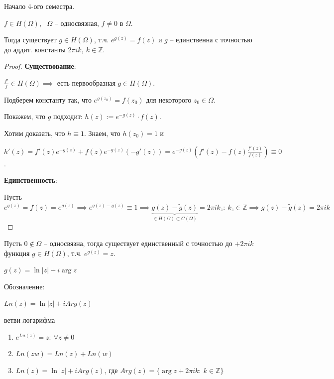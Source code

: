 Начало 4-ого семестра.

\begin{theorem}
    $f \in H(\Omega)$, \ $\Omega$ -- односвязная, $f \not = 0$ в $\Omega$.

    Тогда существует $g \in H(\Omega)$, т.ч. $e^{g(z)} = f(z)$ и $g$ -- единственна с точностью до аддит. константы $2 \pi i k, \ k \in \mathbb{Z}$.
\end{theorem}

\begin{proof}
    \textbf{Существование}:

    $\frac{f'}{f} \in H(\Omega) \implies $ есть первообразная $g \in H(\Omega)$.

    Подберем константу так, что $e^{g(z_0)} =  f(z_0)$ для некоторого $z_0 \in \Omega$.

    Покажем, что $g$ подходит: $h(z) := e^{-g(z)} \cdot f(z)$.

    Хотим доказать, что $h \equiv 1$. Знаем, что $h(z_0) = 1$ и

    $h'(z) = f'(z) e^{-g(z)} + f(z) e^{-g(z)} (-g'(z)) = e^{-g(z)} \left( f'(z) - f(z) \frac{f'(z)}{f(z)} \right) \equiv 0$.

    \textbf{Единственность}:

    Пусть $e^{g(z)} = f(z) = e^{\tilde{g}(z)} \implies e^{g(z) - \tilde{g}(z)} \equiv 1 \implies \underbrace{g(z) - \tilde{g}(z)}_{\in H(\Omega) \subset C(\Omega)} = 2 \pi i k_{z}: \ k_{z} \in \mathbb{Z} \implies g(z) - \tilde{g}(z) = 2 \pi i k$
\end{proof}

\begin{consequence}
    Пусть $0 \not \in \Omega$ -- односвязна, тогда существует единственный с точностью до $+ 2 \pi i k$ функция $g \in H(\Omega)$, т.ч. $e^{g(z)} = z$.
\end{consequence}

\begin{remark}
    $g(z) = \ln{|z|} + i \arg{z}$
\end{remark}

\begin{remark}
    Обозначение:

    $Ln(z) = \ln{|z|} + i Arg(z)$


    ветви логарифма
\end{remark}


\begin{properties}
    \begin{enumerate}
        \item $e^{Ln(z)} = z: \ \forall z \not = 0$
        \item $Ln(z w) = Ln(z) + Ln(w)$
        \item $Ln(z) = \ln{|z|} + i Arg(z)$, где $Arg(z) = \{ \arg{z} + 2 \pi i k: \ k \in \mathbb{Z} \}$
    \end{enumerate}
\end{properties}

